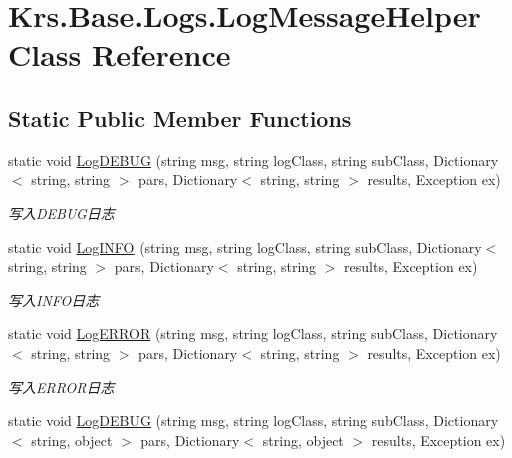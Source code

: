 \hypertarget{class_krs_1_1_base_1_1_logs_1_1_log_message_helper}{\section{Krs.\-Base.\-Logs.\-Log\-Message\-Helper Class Reference}
\label{class_krs_1_1_base_1_1_logs_1_1_log_message_helper}
}
\subsection*{Static Public Member Functions}
\begin{DoxyCompactItemize}
\item 
static void \hyperlink{class_krs_1_1_base_1_1_logs_1_1_log_message_helper_a5197df3b485e1a2aed43c6c631912b37}{Log\-D\-E\-B\-U\-G} (string msg, string log\-Class, string sub\-Class, Dictionary$<$ string, string $>$ pars, Dictionary$<$ string, string $>$ results, Exception ex)
\begin{DoxyCompactList}\small\item\em 写入\-D\-E\-B\-U\-G日志 \end{DoxyCompactList}\item 
static void \hyperlink{class_krs_1_1_base_1_1_logs_1_1_log_message_helper_a6e00fa84c7a3101618f5ea2224dd2bbe}{Log\-I\-N\-F\-O} (string msg, string log\-Class, string sub\-Class, Dictionary$<$ string, string $>$ pars, Dictionary$<$ string, string $>$ results, Exception ex)
\begin{DoxyCompactList}\small\item\em 写入\-I\-N\-F\-O日志 \end{DoxyCompactList}\item 
static void \hyperlink{class_krs_1_1_base_1_1_logs_1_1_log_message_helper_a6ec7fedb53dc620e15c12b9e4cbdfb5f}{Log\-E\-R\-R\-O\-R} (string msg, string log\-Class, string sub\-Class, Dictionary$<$ string, string $>$ pars, Dictionary$<$ string, string $>$ results, Exception ex)
\begin{DoxyCompactList}\small\item\em 写入\-E\-R\-R\-O\-R日志 \end{DoxyCompactList}\item 
static void \hyperlink{class_krs_1_1_base_1_1_logs_1_1_log_message_helper_ab0482eaac7f87a7a0f1e9e8297ede3e4}{Log\-D\-E\-B\-U\-G} (string msg, string log\-Class, string sub\-Class, Dictionary$<$ string, object $>$ pars, Dictionary$<$ string, object $>$ results, Exception ex)

\end{DoxyCompactItemize}
